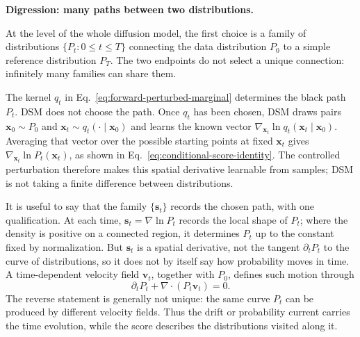 \documentclass[11pt]{article}
\newcommand{\vct}[1]{\bm{#1}}
\begin{document}
\begin{mdframed}[
    linewidth=0.6pt,
    innerleftmargin=6pt,
    innerrightmargin=6pt,
    innertopmargin=6pt,
    innerbottommargin=6pt
]
\textbf{Digression: many paths between two distributions.}\par
At the level of the whole diffusion model, the first choice is a family of
distributions \(\{P_t:0\le t\le T\}\) connecting the data distribution
\(P_0\) to a simple reference distribution \(P_T\). The two endpoints do not
select a unique connection: infinitely many families can share them.
\begin{center}
\end{center}
The kernel \(q_t\) in Eq.~\eqref{eq:forward-perturbed-marginal} determines
the black path \(P_t\). DSM does not choose the path. Once \(q_t\) has been chosen,
DSM draws pairs \(\vct{x}_0\sim P_0\) and
\(\vct{x}_t\sim q_t(\cdot\mid\vct{x}_0)\) and learns the known vector
\(\nabla_{\vct{x}_t}\ln q_t(\vct{x}_t\mid\vct{x}_0)\). Averaging that
vector over the possible starting points at fixed \(\vct{x}_t\) gives
\(\nabla_{\vct{x}_t}\ln P_t(\vct{x}_t)\), as shown in
Eq.~\eqref{eq:conditional-score-identity}. The controlled perturbation therefore
makes this spatial derivative learnable from samples; DSM is not taking a finite
difference between distributions.

It is useful to say that the family \(\{\vct{s}_t\}\) records the chosen path,
with one qualification. At each time,
\(\vct{s}_t=\nabla\ln P_t\) records the local shape of \(P_t\); where the
density is positive on a connected region, it determines \(P_t\) up to the
constant fixed by normalization. But \(\vct{s}_t\) is a spatial derivative,
not the tangent \(\partial_tP_t\) to the curve of distributions, so it does not
by itself say how probability moves in time. A time-dependent velocity field
\(\vct{v}_t\), together with \(P_0\), defines such motion through
\begin{equation*}
    \partial_tP_t+\nabla\cdot(P_t\vct{v}_t)=0.
\end{equation*}
The reverse statement is generally not unique: the same curve \(P_t\) can be
produced by different velocity fields. Thus the drift or probability current
carries the time evolution, while the score describes the distributions visited
along it.


\end{mdframed}
\end{document}
